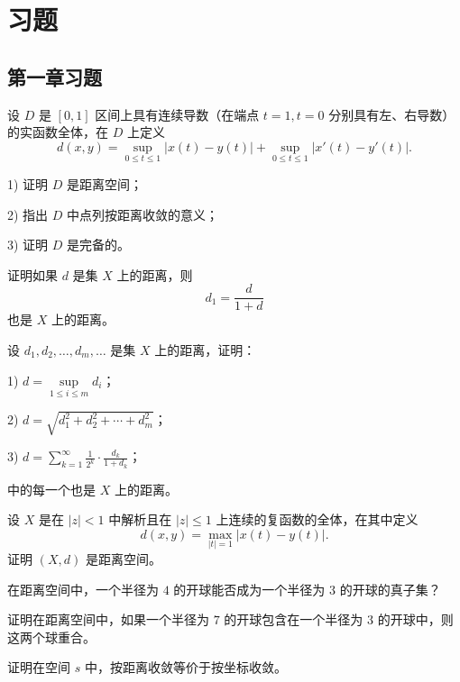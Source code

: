 \chapter{习题}
\section{第一章习题}
\begin{homework}[1.1]
设 $D$ 是 $[0,1]$ 区间上具有连续导数（在端点 $t=1,t=0$ 分别具有左、右导数）的实函数全体，在 $D$ 上定义
\[
d(x,y)=\sup_{0\le t\le 1}|x(t)-y(t)|+\sup_{0\le t\le 1}|x'(t)-y'(t)|.
\]

1) 证明 $D$ 是距离空间；

2) 指出 $D$ 中点列按距离收敛的意义；

3) 证明 $D$ 是完备的。
\end{homework}

\begin{homework}[1.2]
证明如果 $d$ 是集 $X$ 上的距离，则
\[
d_1=\frac{d}{1+d}
\]
也是 $X$ 上的距离。
\end{homework}
\begin{homework}[1.3]
设 $d_1,d_2,\ldots,d_m,\ldots$ 是集 $X$ 上的距离，证明：

1) $d=\sup\limits_{1\le i\le m} d_i$；

2) $d=\sqrt{d_1^2+d_2^2+\cdots+d_m^2}$；

3) $d=\sum_{k=1}^{\infty} \frac{1}{2^k}\cdot \frac{d_k}{1+d_k}$；

中的每一个也是 $X$ 上的距离。
\end{homework}

\begin{homework}[1.4]
设 $X$ 是在 $|z|<1$ 中解析且在 $|z|\le1$ 上连续的复函数的全体，在其中定义
\[
d(x,y)=\max_{|t|=1} |x(t)-y(t)|.
\]
证明 $(X,d)$ 是距离空间。
\end{homework}

\begin{homework}[1.5]
在距离空间中，一个半径为 $4$ 的开球能否成为一个半径为 $3$ 的开球的真子集？
\end{homework}

\begin{homework}[1.6]
证明在距离空间中，如果一个半径为 $7$ 的开球包含在一个半径为 $3$ 的开球中，则这两个球重合。
\end{homework}

\begin{homework}[1.7]
证明在空间 $s$ 中，按距离收敛等价于按坐标收敛。
\end{homework}

